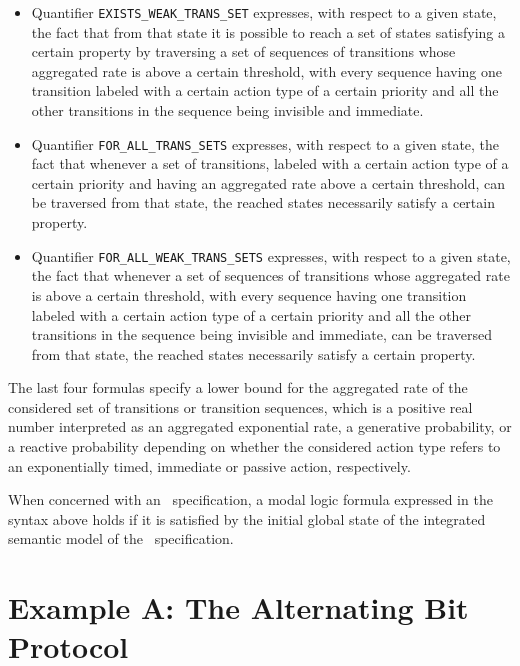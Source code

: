 \begin{itemize}
\item Quantifier {\tt EXISTS\_WEAK\_TRANS\_SET} expresses, with respect to a given state, the fact that from
that state it is possible to reach a set of states satisfying a certain property by traversing a set of
sequences of transitions whose aggregated rate is above a certain threshold, with every sequence having one
transition labeled with a certain action type of a certain priority and all the other transitions in the
sequence being invisible and immediate.

\item Quantifier {\tt FOR\_ALL\_TRANS\_SETS} expresses, with respect to a given state, the fact that
whenever a set of transitions, labeled with a certain action type of a certain priority and having an
aggregated rate above a certain threshold, can be traversed from that state, the reached states necessarily
satisfy a certain property.

\item Quantifier {\tt FOR\_ALL\_WEAK\_TRANS\_SETS} expresses, with respect to a given state, the fact that
whenever a set of sequences of transitions whose aggregated rate is above a certain threshold, with every
sequence having one transition labeled with a certain action type of a certain priority and all the other
transitions in the sequence being invisible and immediate, can be traversed from that state, the reached
states necessarily satisfy a certain property.

        \end{itemize}

\noindent The last four formulas specify a lower bound for the aggregated rate of the considered set of
transitions or transition sequences, which is a positive real number interpreted as an aggregated
exponential rate, a generative probability, or a reactive probability depending on whether the considered
action type refers to an exponentially timed, immediate or passive action, respectively.

When concerned with an \aemilia\ specification, a modal logic formula expressed in the syntax above holds if
it is satisfied by the initial global state of the integrated semantic model of the \aemilia\ specification.



\section{Example A: The Alternating Bit Protocol}

